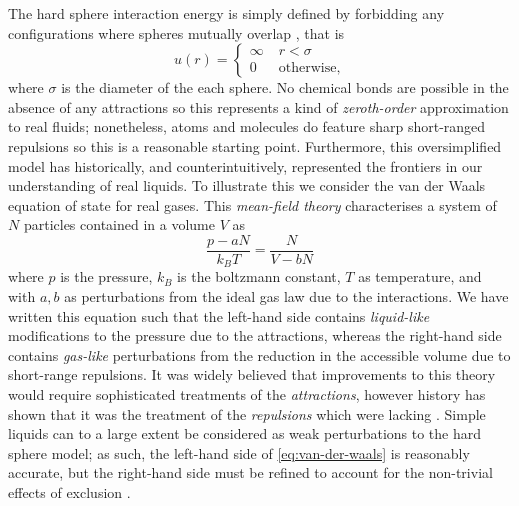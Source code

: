 \documentclass[11pt,twoside]{report}
\begin{document}
The hard sphere interaction energy is simply defined by forbidding any configurations where spheres mutually overlap%
,
that is
\begin{equation}\label{eq:hs-interaction}
  u(r) =
  \begin{cases}
    \infty & \; r < \sigma \\
    0 & \; \textrm{otherwise},
  \end{cases}
\end{equation}
where $\sigma$ is the diameter of the each sphere.
No chemical bonds are possible in the absence of any attractions so this represents a kind of \emph{zeroth-order} approximation to real fluids; nonetheless, atoms and molecules do feature sharp short-ranged repulsions so this is a reasonable starting point.
Furthermore, this oversimplified model has historically, and counterintuitively, represented the frontiers in our understanding of real liquids.
To illustrate this we consider the van der Waals equation of state for real gases.
This \emph{mean-field theory} characterises a system of $N$ particles contained in a volume $V$ as
\begin{equation}\label{eq:van-der-waals}
  \frac{p - a N}{k_B T} = \frac{N}{V - b N}
\end{equation}
where $p$ is the pressure, $k_B$ is the boltzmann constant, $T$ as temperature, and with $a,b$ as perturbations from the ideal gas law due to the interactions.
We have written this equation such that the left-hand side contains \emph{liquid-like} modifications to the pressure due to the attractions, whereas the right-hand side contains \emph{gas-like} perturbations from the reduction in the accessible volume due to short-range repulsions.
It was widely believed that improvements to this theory would require sophisticated treatments of the \emph{attractions}, however history has shown that it was the treatment of the \emph{repulsions} which were lacking \cite{WidomS1967,Hasen2013,Santos2016}.
Simple liquids can to a large extent be considered as weak perturbations to the hard sphere model; as such, the left-hand side of \eqref{eq:van-der-waals} is reasonably accurate, but the right-hand side must be refined to account for the non-trivial effects of exclusion \cite{Hansen2013}.

\end{document}
